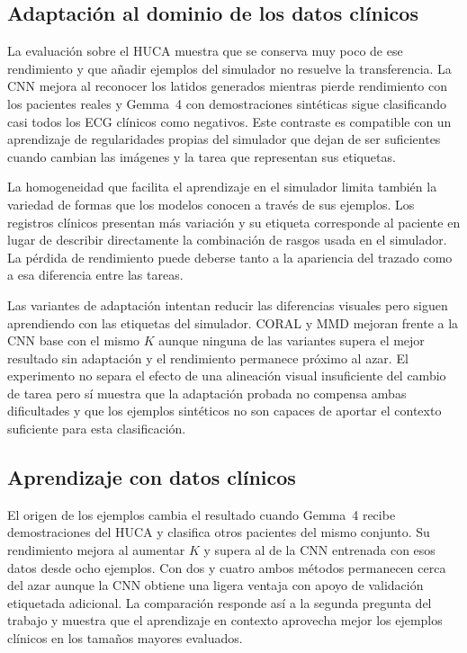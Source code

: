 \subsection{Adaptación al dominio de los datos clínicos}

La evaluación sobre el HUCA muestra que se conserva muy poco de ese rendimiento y que añadir ejemplos del simulador no resuelve la transferencia. La CNN mejora al reconocer los latidos generados mientras pierde rendimiento con los pacientes reales y Gemma~4 con demostraciones sintéticas sigue clasificando casi todos los ECG clínicos como negativos. Este contraste es compatible con un aprendizaje de regularidades propias del simulador que dejan de ser suficientes cuando cambian las imágenes y la tarea que representan sus etiquetas.

La homogeneidad que facilita el aprendizaje en el simulador limita también la variedad de formas que los modelos conocen a través de sus ejemplos. Los registros clínicos presentan más variación y su etiqueta corresponde al paciente en lugar de describir directamente la combinación de rasgos usada en el simulador. La pérdida de rendimiento puede deberse tanto a la apariencia del trazado como a esa diferencia entre las tareas.

Las variantes de adaptación intentan reducir las diferencias visuales pero siguen aprendiendo con las etiquetas del simulador. CORAL y MMD mejoran frente a la CNN base con el mismo \(K\) aunque ninguna de las variantes supera el mejor resultado sin adaptación y el rendimiento permanece próximo al azar. El experimento no separa el efecto de una alineación visual insuficiente del cambio de tarea pero sí muestra que la adaptación probada no compensa ambas dificultades y que los ejemplos sintéticos no son capaces de aportar el contexto suficiente para esta clasificación.

\subsection{Aprendizaje con datos clínicos}

El origen de los ejemplos cambia el resultado cuando Gemma~4 recibe demostraciones del HUCA y clasifica otros pacientes del mismo conjunto. Su rendimiento mejora al aumentar \(K\) y supera al de la CNN entrenada con esos datos desde ocho ejemplos. Con dos y cuatro ambos métodos permanecen cerca del azar aunque la CNN obtiene una ligera ventaja con apoyo de validación etiquetada adicional. La comparación responde así a la segunda pregunta del trabajo y muestra que el aprendizaje en contexto aprovecha mejor los ejemplos clínicos en los tamaños mayores evaluados.

